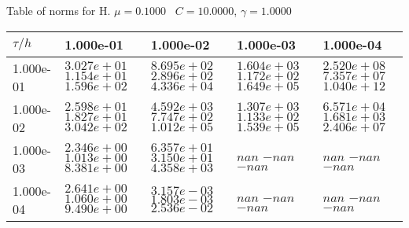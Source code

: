 \begin{center}
Table of norms for H. $\mu = 0.1000$ \, $C = 10.0000$, $\gamma = 1.0000$
  
\begin{tabular}{|p{1in}|p{1in}|p{1in}|p{1in}|p{1in}|} \hline
$\tau / h$ &1.000e-01 &1.000e-02 &1.000e-03 &1.000e-04 \\ \hline 
1.000e-01 & $3.027e+01$  $1.154e+01$  $1.596e+02$  & $8.695e+02$  $2.896e+02$  $4.336e+04$  & $1.604e+03$  $1.172e+02$  $1.649e+05$  & $2.520e+08$  $7.357e+07$  $1.040e+12$  \\ \hline 
1.000e-02 & $2.598e+01$  $1.827e+01$  $3.042e+02$  & $4.592e+03$  $7.747e+02$  $1.012e+05$  & $1.307e+03$  $1.133e+02$  $1.539e+05$  & $6.571e+04$  $1.681e+03$  $2.406e+07$  \\ \hline 
1.000e-03 & $2.346e+00$  $1.013e+00$  $8.381e+00$  & $6.357e+01$  $3.150e+01$  $4.358e+03$  & $nan$  $-nan$  $-nan$  & $nan$  $-nan$  $-nan$  \\ \hline 
1.000e-04 & $2.641e+00$  $1.060e+00$  $9.490e+00$  & $3.157e-03$  $1.803e-03$  $2.536e-02$  & $nan$  $-nan$  $-nan$  & $nan$  $-nan$  $-nan$  \\ \hline 

\end{tabular}\\[20pt]
\end{center}

